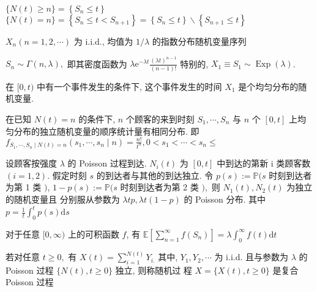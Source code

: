 \documentclass[10pt]{yerbaformat}
\begin{document}
\begin{lemma}
    $\{N(t) \geq n\}=\left\{S_{n} \leq t\right\}$ \\
    $\{N(t)=n\}=\left\{S_{n} \leq t<S_{n+1}\right\}=\left\{S_{n} \leq t\right\} \backslash\left\{S_{n+1} \leq t\right\}$
\end{lemma}

\begin{lemma}[来到时间间隔分布]
    $X_{n}(n=1,2, \cdots)$ 为 i.i.d., 均值为 $1 / \lambda$ 的指数分布随机变量序列
\end{lemma}

\begin{lemma}[等待时间分布]
    $S_{n} \sim \Gamma(n, \lambda),$ 即其密度函数为 $\lambda \mathrm{e}^{-\lambda t} \frac{(\lambda t)^{n-1}}{(n-1) !}$ 特别的, $X_{1} \equiv S_{1} \sim \operatorname{Exp}(\lambda)$.
\end{lemma}

\begin{lemma}
    在 $[0, t)$ 中有一个事件发生的条件下, 这个事件发生的时间 $X_{1}$ 是个均匀分布的随机变量.
\end{lemma}

\begin{theorem}
    在已知 $N(t)=n$ 的条件下, $n$ 个顾客的来到时刻 $S_{1}, \cdots, S_{n}$ 与 $n$ 个 $[0, t]$ 上均匀分布的独立随机变量的顺序统计量有相同分布. 即 $f_{S_{1}, \cdots, S_{n} \mid N(t)=n}\left(s_{1}, \cdots, s_{n} \mid n\right)=\frac{n !}{t^{n}}, 0<s_{1}<\cdots<s_{n} \leq $
\end{theorem}

\begin{theorem}
    设顾客按强度 $\lambda$ 的 Poisson 过程到达. $N_{i}(t)$ 为 $[0, t]$ 中到达的第新 $\mathrm{i}$ 类顾客数 $(i=1,2) .$ 假定时刻 $s$ 的到达者与其他的到达独立. 令
    $p(s):=\mathbb{P}(s$ 时刻到达者为第 1 类 $)$, $1-p(s):=\mathbb{P}(s$ 时刻到达者为第 2 类 $),$ 则 $N_{1}(t), N_{2}(t)$ 为独立的随机变量且 分别服从参数为 $\lambda t p, \lambda t(1-p)$ 的 Poisson 分布. 其中 $p=\frac{1}{t} \int_{0}^{t} p(s) \mathrm{d} s$
\end{theorem}

\begin{lemma}
    对于任意 $[0, \infty)$ 上的可积函数 $f$, 有 $\mathbb{E}\left[\sum_{n=1}^{\infty} f\left(S_{n}\right)\right]=\lambda \int_{0}^{\infty} f(t) \mathrm{d} t$
\end{lemma}

\begin{definition}[复合 Poisson 过程]
    若对任意 $t \geq 0,$ 有 $X(t)=\sum_{i=1}^{N(t)} Y_{i .}$ 其中, $Y_{1}, Y_{2}, \cdots$ 为 i.i.d. 且与参数为 $\lambda$ 的 Poisson 过程 $\{N(t), t \geq 0\}$ 独立, 则称随机过 程 $X=\{X(t), t \geq 0\}$ 是复合 Poisson 过程
\end{definition}
\end{document}
